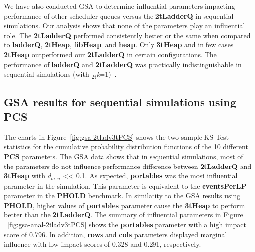 We have also conducted GSA to determine influential parameters impacting performance of other scheduler queues versus the \textbf{2tLadderQ} in sequential simulations. Our analysis shows that none of the parameters play an influential role. The \textbf{2tLadderQ} performed consistently better or the same when compared to \textbf{ladderQ}, \textbf{2tHeap}, \textbf{fibHeap}, and \textbf{heap}. Only \textbf{3tHeap} and in few cases \textbf{2tHeap} outperformed our \textbf{2tLadderQ} in certain configurations.  The performance of \textbf{ladderQ} and \textbf{2tLadderQ} was practically indistinguishable in sequential simulations (with \textsubscript{2t}\textit{k}=1)~\cite{higiro2017multi}.

\subsection{GSA results for sequential simulations using PCS}\label{sec:seq-gsa-PCS}

The charts in Figure~\ref{fig:gsa-2tladv3tPCS} shows the two-sample KS-Test statistics for the cumulative probability distribution functions of the 10 different \textbf{PCS} parameters. The GSA data shows that in sequential simulations, most of  the parameters do not influence performance difference between \textbf{2tLadderQ} and \textbf{3tHeap} with $d_{m,n}$ << 0.1. As expected, \textbf{portables} was the most influential parameter in the simulation. This parameter is equivalent to the \textbf{eventsPerLP} parameter in the \textbf{PHOLD} benchmark. In similarity to the GSA results using \textbf{PHOLD}, higher values of \textbf{portables} parameter cause the \textbf{3tHeap} to perform better than the \textbf{2tLadderQ}. The summary of influential parameters in Figure ~\ref{fig:gsa-anal-2tladv3tPCS} shows the \textbf{portables} parameter with a high impact score of 0.796. In addition, \textbf{rows} and \textbf{cols} parameters displayed marginal influence with low impact scores of 0.328 and 0.291, respectively.   

